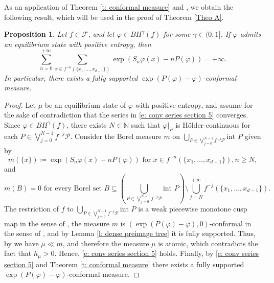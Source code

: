 \documentclass[12pt]{amsart}
\numberwithin{equation}{section} %
\numberwithin{figure}{section} %
\theoremstyle{plain}
\newtheorem{prop}{Proposition}[section]
\theoremstyle{definition}
\theoremstyle{remark}
\theoremstyle{citing}
\newcommand{\N}{\mathbb{N}}
\renewcommand{\=}{\coloneqq}
\begin{document}
As an application of Theorem \ref{t: conformal measure} and \cite[Theorem 6]{Dobbs}, we obtain the following result, which will be used in the proof of Theorem \ref{Theo A}.
\begin{prop}\label{p: before proof thm C}
    Let $f \in \mathscr{F}$, and let $\varphi \in BH^\gamma(f)$ for some $\gamma \in (0,1]$. If $\varphi$ admits an equilibrium state with positive entropy, then 
      \begin{equation}\label{e: conv series section 5}
        \sum_{n=0}^{+\infty}\sum_{x\in f^{-n}(\{x_1,\dots,x_{d-1}\})}\exp(S_n\varphi(x)- nP(\varphi))=+\infty.
    \end{equation}
    In particular, there exists a fully supported $\exp(P(\varphi)-\varphi)$-conformal measure.
\end{prop}
\begin{proof}
    Let $\mu$ be an equilibrium state of $\varphi$ with positive entropy, and assume for the sake of contradiction that the series in \eqref{e: conv series section 5} converges. Since $\varphi \in BH^\gamma(f)$, there exists $N\in \N$ such that $\varphi|_P$ is Hölder-continuous for each $P\in \bigvee_{j=0}^{N-1}f^{-j}\mathcal{P}$. Consider the Borel measure $m$ on $\bigcup_{P\in \bigvee_{j=0}^{N-1}f^{-j}\mathcal{P}}\text{int }P$ given by
    \begin{equation}
      m(\{x\})\= \exp(S_n\varphi(x) - nP(\varphi)) \text{ for } x\in f^{-n}(\{x_1,\dots,x_{d-1}\}), n\geq N,
  \end{equation}
  and 
  \begin{equation*}
      m(B)=0 \text{ for every Borel set } B\subseteq \left( \bigcup_{P\in \bigvee_{j=0}^{N-1}f^{-j}\mathcal{P}}\text{int } P\right) \setminus \bigcup_{j=N}^{+\infty} f^{-j}(\{x_1,\dots,x_{d-1}\}).
  \end{equation*}
  The restriction of $f$ to $\bigcup_{P\in \bigvee_{j=0}^{N-1}f^{-j}\mathcal{P}}\text{int }P$ is a weak piecewise monotone cusp map in the sense of \cite[Definition 1]{Dobbs}, the measure $m$ is $(\exp(P(\varphi)-\varphi),0)$-conformal in the sense of \cite[Definition 2]{Dobbs}, and by Lemma \ref{l: dense preimage tree} it is fully supported. Thus, by \cite[Theorem 6]{Dobbs} we have $\mu\ll m$, and therefore the measure $\mu$ is atomic, which contradicts the fact that $h_{\mu}>0$. Hence, \eqref{e: conv series section 5} holds. Finally, by \eqref{e: conv series section 5} and Theorem \ref{t: conformal measure} there exists a fully supported $\exp(P(\varphi)- \varphi)$-conformal measure.
\end{proof}
\end{document}
